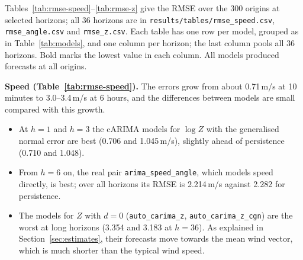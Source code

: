 \documentclass[11pt,a4paper]{article}
\newcommand{\code}[1]{\texttt{#1}}
\begin{document}
Tables~\ref{tab:rmse-speed}--\ref{tab:rmse-z} give the RMSE over the 300 origins at selected
horizons; all 36 horizons are in \code{results/tables/rmse\_speed.csv}, \code{rmse\_angle.csv} and
\code{rmse\_z.csv}. Each table has one row per model, grouped as in Table~\ref{tab:models}, and
one column per horizon; the last column pools all 36 horizons. Bold marks the lowest value in each
column. All models produced forecasts at all origins.

\textbf{Speed (Table~\ref{tab:rmse-speed}).} The errors grow from about 0.71\,m/s at 10 minutes to
3.0--3.4\,m/s at 6 hours, and the differences between models are small compared with this growth.
\begin{itemize}
  \item At $h = 1$ and $h = 3$ the cARIMA models for $\log Z$ with the generalised normal error are
    best (0.706 and 1.045\,m/s), slightly ahead of persistence (0.710 and 1.048).
  \item From $h = 6$ on, the real pair \code{arima\_speed\_angle}, which models speed directly, is
    best; over all horizons its RMSE is 2.214\,m/s against 2.282 for persistence.
  \item The models for $Z$ with $d = 0$ (\code{auto\_carima\_z}, \code{auto\_carima\_z\_cgn}) are the
    worst at long horizons (3.354 and 3.183 at $h = 36$). As explained in
    Section~\ref{sec:estimates}, their forecasts move towards the mean wind vector, which is much
    shorter than the typical wind speed.
\end{itemize}
\end{document}
